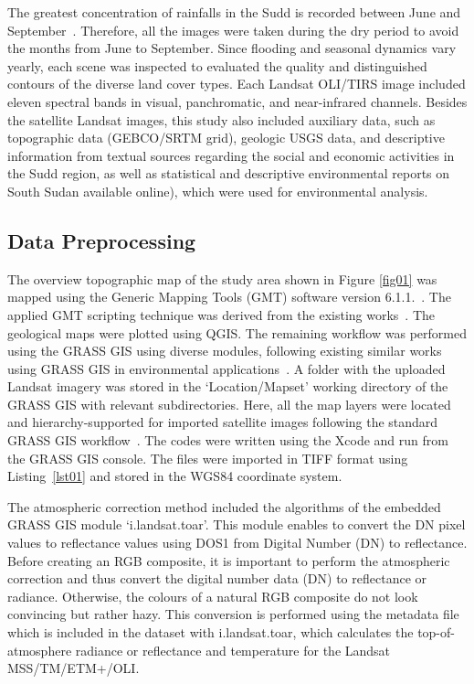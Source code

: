 \documentclass[analytics,article,accept,pdftex,moreauthors]{Definitions/mdpi}
\begin{document}
The greatest concentration of rainfalls in the Sudd is recorded between June and September~\cite{Climatic}. Therefore, all the images were taken during the dry period to avoid the months from June to September. Since flooding and seasonal dynamics vary yearly, each scene was inspected to evaluated the quality and distinguished contours of the diverse land cover types. Each Landsat OLI/TIRS image included eleven spectral bands in visual, panchromatic, and near-infrared channels. Besides the satellite Landsat images, this study also included auxiliary data, such as topographic data (GEBCO/SRTM grid), geologic USGS data, and descriptive information from textual sources regarding the social and economic activities in the Sudd region, as well as statistical and descriptive environmental reports on South Sudan available online), which were used for environmental analysis.

\subsection{Data Preprocessing}

The overview topographic map of the study area shown in Figure \ref{fig01} was mapped using the Generic Mapping Tools (GMT) software version 6.1.1.~\cite{Wessel}. The applied GMT scripting technique was derived from the existing works~\cite{Lemenkova202203,data7060074}. The geological maps were plotted using QGIS. The remaining workflow was performed using the GRASS GIS using diverse modules, following existing similar works using GRASS GIS in environmental applications~\cite{HOFIERKA201720,JASIEWICZ20111162,JASIEWICZ20111525,SOROKINE2007685}. A folder with the uploaded Landsat imagery was stored in the `Location/Mapset' working directory of the GRASS GIS with relevant subdirectories. Here, all the map layers were located and hierarchy-supported for imported satellite images following the standard GRASS GIS workflow~\cite{NETELER2012124}. The codes were written using the Xcode and run from the GRASS GIS console. The files were imported in TIFF format using Listing~\ref{lst01} and stored in the WGS84 coordinate system. 

{The atmospheric correction method included the algorithms of the embedded GRASS GIS module `i.landsat.toar'. This module enables to convert the DN pixel values to reflectance values using DOS1 from Digital Number (DN) to reflectance. %
Before creating an RGB composite, it is important to perform the atmospheric correction and thus  convert the digital number data (DN) to reflectance or radiance. %
Otherwise, the colours of a natural RGB composite do not look convincing but rather hazy. This conversion is performed using the metadata file which is included in the dataset with i.landsat.toar, which calculates the top-of-atmosphere radiance or reflectance and temperature for the Landsat MSS/TM/ETM+/OLI}.
\end{document}

